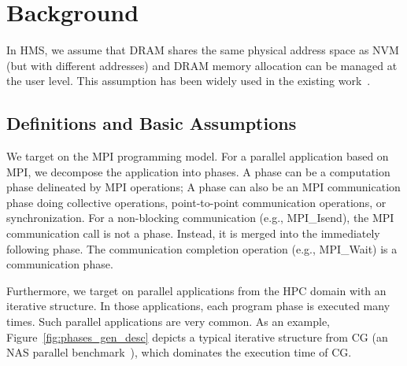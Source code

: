 \section{Background}
\label{sec:bg}
In HMS, we assume that DRAM shares the same physical address space as NVM (but with different addresses) and DRAM memory allocation can be managed at the user level. This assumption has been widely used in the existing work~\cite{eurosys16:dulloor, nas16:giardino, asplos16:lin, ismm16:shen,  hpdc16:wu}. %

\subsection{Definitions and Basic Assumptions}
We target on the MPI programming model.
For a parallel application based on MPI, we decompose the application into phases.
A phase can be a computation phase delineated by MPI operations;
A phase can also be an MPI communication phase doing collective operations, point-to-point communication operations, 
or synchronization. For a non-blocking communication (e.g., {\selectfont MPI\_Isend}), the MPI communication call 
is not a phase. Instead, it is merged into 
the immediately following phase. 
The communication completion operation (e.g., {\selectfont MPI\_Wait}) is a communication phase. 

Furthermore, we target on parallel applications from the HPC domain with
an iterative structure. In those applications, each program phase is executed many times.
Such parallel applications are very common. 
As an example, Figure~\ref{fig:phases_gen_desc} depicts a typical iterative structure from CG (an NAS parallel benchmark~\cite{nas}), which dominates the execution time of CG.

